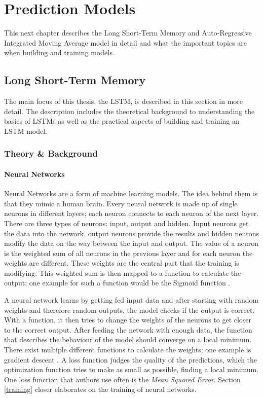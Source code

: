 \section{Prediction Models}
This next chapter describes the Long Short-Term Memory and Auto-Regressive Integrated Moving Average model in detail and what the important topics are when building and training models.
\subsection{Long Short-Term Memory}
The main focus of this thesis, the LSTM, is described in this section in more detail.
The description includes the theoretical background to understanding the basics of LSTMs as well as the practical aspects of building and training an LSTM model.
\subsubsection{Theory \& Background}
\paragraph{Neural Networks}
Neural Networks are a form of machine learning models.
The idea behind them is that they mimic a human brain.
Every neural network is made up of single neurons in different layers; each neuron connects to each neuron of the next layer.
There are three types of neurons: input, output and hidden.
Input neurons get the data into the network, output neurons provide the results and hidden neurons modify the data on the way between the input and output.
The value of a neuron is the weighted sum of all neurons in the previous layer and for each neuron the weights are different.
These weights are the central part that the training is modifying.
This weighted sum is then mapped to a function to calculate the output; one example for such a function would be the Sigmoid function \cite[p. 11]{DeepLearningBook}.

A neural network learns by getting fed input data and after starting with random weights and therefore random outputs, the model checks if the output is correct.
With a function, it then tries to change the weights of the neurons to get closer to the correct output.
After feeding the network with enough data, the function that describes the behaviour of the model should converge on a local minimum.
There exist multiple different functions to calculate the weights; one example is gradient descent \cite[Ch. 10.5.a]{RnnDesign}.
A loss function judges the quality of the predictions, which the optimization function tries to make as small as possible, finding a local minimum.
One loss function that authors use often is the \textit{Mean Squared Error}.
Section \ref{training} closer elaborates on the training of neural networks.


